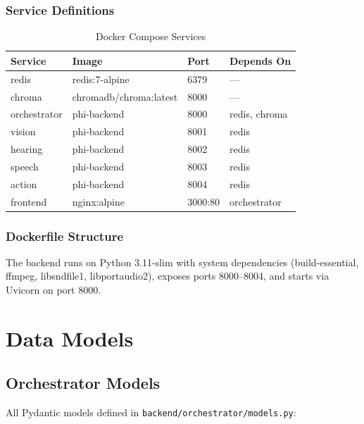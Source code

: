 \documentclass[12pt,a4paper,twoside]{report}
\begin{document}
\subsection{Service Definitions}

\begin{table}[H]
\centering
\begin{tabularx}{\textwidth}{|l|l|l|X|}
\hline
\rowcolor{phiblue!20}
\textbf{Service} & \textbf{Image} & \textbf{Port} & \textbf{Depends On} \\
\hline
redis & redis:7-alpine & 6379 & --- \\
\hline
chroma & chromadb/chroma:latest & 8000 & --- \\
\hline
orchestrator & phi-backend & 8000 & redis, chroma \\
\hline
vision & phi-backend & 8001 & redis \\
\hline
hearing & phi-backend & 8002 & redis \\
\hline
speech & phi-backend & 8003 & redis \\
\hline
action & phi-backend & 8004 & redis \\
\hline
frontend & nginx:alpine & 3000:80 & orchestrator \\
\hline
\end{tabularx}
\caption{Docker Compose Services}
\end{table}

\subsection{Dockerfile Structure}

The backend runs on Python 3.11-slim with system dependencies (build-essential, ffmpeg, libsndfile1, libportaudio2), exposes ports 8000--8004, and starts via Uvicorn on port 8000.
\chapter{Data Models}

\section{Orchestrator Models}

All Pydantic models defined in \texttt{backend/orchestrator/models.py}:
\end{document}
